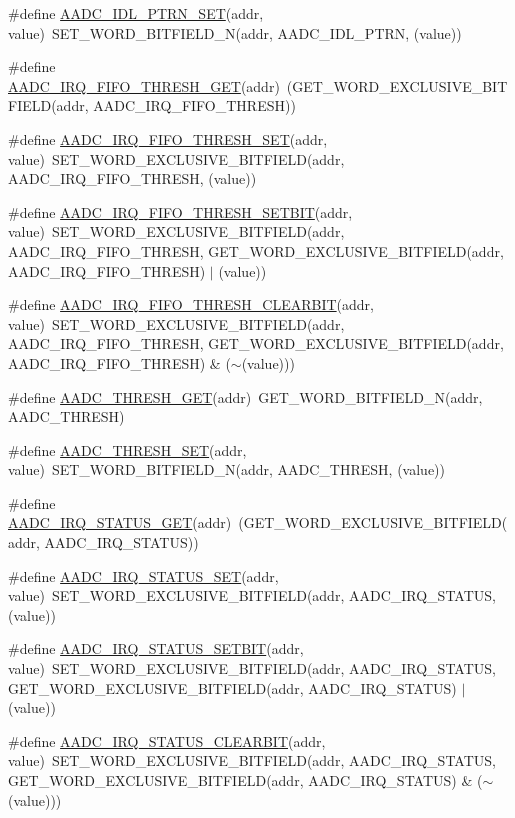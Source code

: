 \begin{DoxyCompactItemize}
\#define \hyperlink{a00542_a79636d320b6bdfec94d96b42db6cec75}{AADC\_\-IDL\_\-PTRN\_\-SET}(addr, value)~SET\_\-WORD\_\-BITFIELD\_\-N(addr, AADC\_\-IDL\_\-PTRN, (value))
\item 
\#define \hyperlink{a00542_a2f46f163e8826a1ae81288681eb5b36f}{AADC\_\-IRQ\_\-FIFO\_\-THRESH\_\-GET}(addr)~(GET\_\-WORD\_\-EXCLUSIVE\_\-BITFIELD(addr, AADC\_\-IRQ\_\-FIFO\_\-THRESH))
\item 
\#define \hyperlink{a00542_a85823491dfa30a03ac3cf549d4f44475}{AADC\_\-IRQ\_\-FIFO\_\-THRESH\_\-SET}(addr, value)~SET\_\-WORD\_\-EXCLUSIVE\_\-BITFIELD(addr, AADC\_\-IRQ\_\-FIFO\_\-THRESH, (value))
\item 
\#define \hyperlink{a00542_ae5ed77594a29a150299902304cc449a7}{AADC\_\-IRQ\_\-FIFO\_\-THRESH\_\-SETBIT}(addr, value)~SET\_\-WORD\_\-EXCLUSIVE\_\-BITFIELD(addr, AADC\_\-IRQ\_\-FIFO\_\-THRESH, GET\_\-WORD\_\-EXCLUSIVE\_\-BITFIELD(addr, AADC\_\-IRQ\_\-FIFO\_\-THRESH) $|$ (value))
\item 
\#define \hyperlink{a00542_a6a00f47414d1f66b3a6a626f523420ad}{AADC\_\-IRQ\_\-FIFO\_\-THRESH\_\-CLEARBIT}(addr, value)~SET\_\-WORD\_\-EXCLUSIVE\_\-BITFIELD(addr, AADC\_\-IRQ\_\-FIFO\_\-THRESH, GET\_\-WORD\_\-EXCLUSIVE\_\-BITFIELD(addr, AADC\_\-IRQ\_\-FIFO\_\-THRESH) \& ($\sim$(value)))
\item 
\#define \hyperlink{a00542_a03c39d1ff03d2ffc1d2b8f7acbd0761d}{AADC\_\-THRESH\_\-GET}(addr)~GET\_\-WORD\_\-BITFIELD\_\-N(addr, AADC\_\-THRESH)
\item 
\#define \hyperlink{a00542_a56cfcbc2efbe9012420babfa8a8c78ad}{AADC\_\-THRESH\_\-SET}(addr, value)~SET\_\-WORD\_\-BITFIELD\_\-N(addr, AADC\_\-THRESH, (value))
\item 
\#define \hyperlink{a00542_adeee4bc10cdfa8a7ae093907f7adb1b1}{AADC\_\-IRQ\_\-STATUS\_\-GET}(addr)~(GET\_\-WORD\_\-EXCLUSIVE\_\-BITFIELD(addr, AADC\_\-IRQ\_\-STATUS))
\item 
\#define \hyperlink{a00542_a11b75189b9cfd3e03ee65ebab9dd7c1f}{AADC\_\-IRQ\_\-STATUS\_\-SET}(addr, value)~SET\_\-WORD\_\-EXCLUSIVE\_\-BITFIELD(addr, AADC\_\-IRQ\_\-STATUS, (value))
\item 
\#define \hyperlink{a00542_a144e968aa03c94c250f41b373244e739}{AADC\_\-IRQ\_\-STATUS\_\-SETBIT}(addr, value)~SET\_\-WORD\_\-EXCLUSIVE\_\-BITFIELD(addr, AADC\_\-IRQ\_\-STATUS, GET\_\-WORD\_\-EXCLUSIVE\_\-BITFIELD(addr, AADC\_\-IRQ\_\-STATUS) $|$ (value))
\item 
\#define \hyperlink{a00542_a2b2a18bbf5bac488885ee00decd2aecb}{AADC\_\-IRQ\_\-STATUS\_\-CLEARBIT}(addr, value)~SET\_\-WORD\_\-EXCLUSIVE\_\-BITFIELD(addr, AADC\_\-IRQ\_\-STATUS, GET\_\-WORD\_\-EXCLUSIVE\_\-BITFIELD(addr, AADC\_\-IRQ\_\-STATUS) \& ($\sim$(value)))

\end{DoxyCompactItemize}
